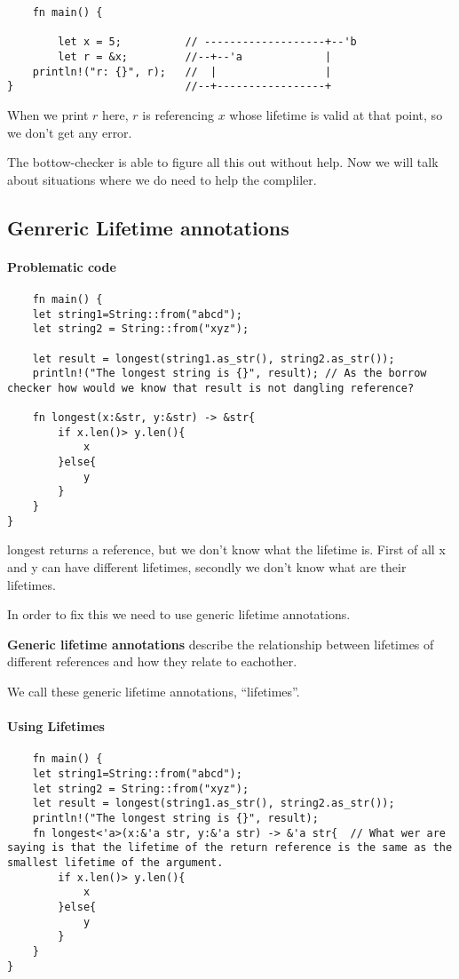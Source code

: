 \begin{lstlisting}
    fn main() {
    
        let x = 5;          // -------------------+--'b
        let r = &x;         //--+--'a             |
    println!("r: {}", r);   //  |                 |
}                           //--+-----------------+
\end{lstlisting}

When we print $r$ here, $r$ is referencing $x$ whose lifetime is valid at that point, so we don't get any error.

The bottow-checker is able to figure all this out without help. Now we will talk about situations where we do need to help the compliler.

\subsection{Genreric Lifetime annotations}

\paragraph*{Problematic code}\begin{lstlisting}
    fn main() {
    let string1=String::from("abcd");
    let string2 = String::from("xyz");

    let result = longest(string1.as_str(), string2.as_str());
    println!("The longest string is {}", result); // As the borrow checker how would we know that result is not dangling reference?

    fn longest(x:&str, y:&str) -> &str{
        if x.len()> y.len(){
            x
        }else{
            y
        }
    }
}
\end{lstlisting}
longest returns a reference, but we don't know what the lifetime is. First of all x and y can have different lifetimes, secondly we don't know what are their lifetimes.

In order to fix this we need to use generic lifetime annotations.\begin{definition}
    \textbf{Generic lifetime annotations} describe the relationship between lifetimes of different references and how they relate to eachother.
\end{definition}
We call these generic lifetime annotations, ``lifetimes''.

\paragraph*{Using Lifetimes}\begin{lstlisting}
    fn main() {
    let string1=String::from("abcd");
    let string2 = String::from("xyz");
    let result = longest(string1.as_str(), string2.as_str());
    println!("The longest string is {}", result); 
    fn longest<'a>(x:&'a str, y:&'a str) -> &'a str{  // What wer are saying is that the lifetime of the return reference is the same as the smallest lifetime of the argument.
        if x.len()> y.len(){
            x
        }else{
            y
        }
    }
}
\end{lstlisting}

